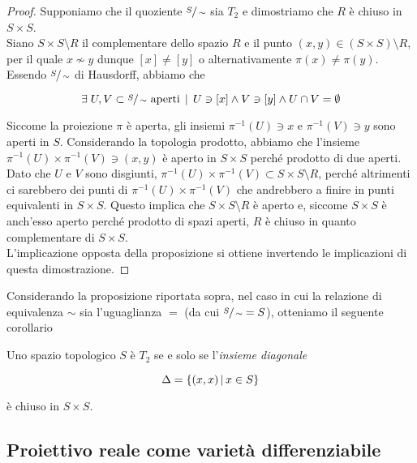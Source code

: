 \begin{proof}\label{solved-es2-3}
	Supponiamo che il quoziente $ \sfrac{S}{\sim} $ sia $ T_{2} $ e dimostriamo che $ R $ è chiuso in $ S \times S $.\\
	Siano $ S \times S \setminus R $ il complementare dello spazio $ R $ e il punto $ (x,y) \in (S \times S) \setminus R $, per il quale $ x \nsim y $ dunque $ [x] \neq [y] $ o alternativamente $ \pi(x) \neq \pi(y) $. Essendo $ \sfrac{S}{\sim} $ di Hausdorff, abbiamo che
	
	\begin{equation}
		\exists \; U, V \subset \sfrac{S}{\sim} \text{ aperti} \, \mid \, U \ni [x] \wedge V \ni [y] \wedge U \cap V = \emptyset
	\end{equation}
	
	Siccome la proiezione $ \pi $ è aperta, gli insiemi $ \pi^{-1}(U) \ni x $ e $ \pi^{-1}(V) \ni y $ sono aperti in $ S $. Considerando la topologia prodotto, abbiamo che l'insieme $ \pi^{-1}(U) \times \pi^{-1}(V) \ni (x,y) $ è aperto in $ S \times S $ perché prodotto di due aperti. Dato che $ U $ e $ V $ sono disgiunti, $ \pi^{-1}(U) \times \pi^{-1}(V) \subset S \times S \setminus R $, perché altrimenti ci sarebbero dei punti di $ \pi^{-1}(U) \times \pi^{-1}(V) $ che andrebbero a finire in punti equivalenti in $ S \times S $. Questo implica che $ S \times S \setminus R $ è aperto e, siccome $ S \times S $ è anch'esso aperto perché prodotto di spazi aperti, $ R $ è chiuso in quanto complementare di $ S \times S $.\\
	L'implicazione opposta della proposizione si ottiene invertendo le implicazioni di questa dimostrazione.
\end{proof}

Considerando la proposizione riportata sopra, nel caso in cui la relazione di equivalenza $ \sim $ sia l'uguaglianza $ = $ (da cui $ \sfrac{S}{\sim} = S $), otteniamo il seguente corollario

\begin{corollary}
	Uno spazio topologico $ S $ è $ T_{2} $ se e solo se l'\textit{insieme diagonale}
	
	\begin{equation}
		\Delta = \left\{ (x,x) \, \middle| \, x \in S \right\}
	\end{equation}
	
	è chiuso in $ S \times S $.
\end{corollary}

\subsection{Proiettivo reale come varietà differenziabile}

